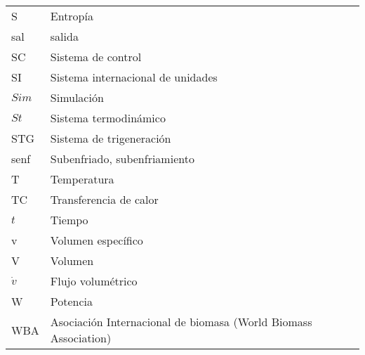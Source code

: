 \begin{longtable}[H]{p{3.5cm}p{12cm}}
        S                     & Entropía \\
        sal                   & salida \\
        SC                    & Sistema de control \\
        SI                    & Sistema internacional de unidades \\
        $Sim$                 & Simulación \\
        $St$                  & Sistema termodinámico \\
        STG                   & Sistema de trigeneración \\
        senf                  & Subenfriado, subenfriamiento \\
        T                     & Temperatura \\
        TC                    & Transferencia de calor \\
        $t$                   & Tiempo \\
        v                     & Volumen específico \\
        V                     & Volumen \\
        $\dot{v}$             & Flujo volumétrico \\
        W                     & Potencia \\
        WBA                   & Asociación Internacional de biomasa (World Biomass Association) \\
        \hline

\end{longtable} 

